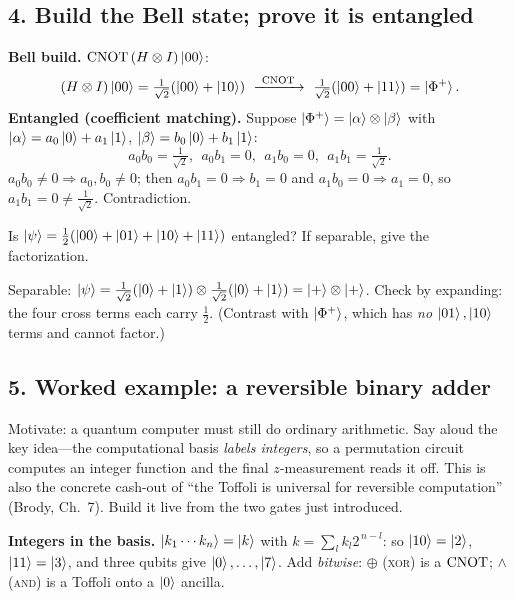 \documentclass[11pt]{article}
\begin{document}
\subsection*{4. Build the Bell state; prove it is entangled }
\begin{board}
\textbf{Bell build.} $\mathrm{CNOT}\,(H\otimes I)\ket{00}$:
\[
  (H\otimes I)\ket{00}=\tfrac1{\sqrt2}(\ket{00}+\ket{10})
  \ \xrightarrow{\ \CNOT\ }\ \tfrac1{\sqrt2}(\ket{00}+\ket{11})=\ket{\Phi^+}.
\]
\textbf{Entangled (coefficient matching).} Suppose $\ket{\Phi^+}=\ket\alpha\otimes\ket\beta$
with $\ket\alpha=a_0\ket0+a_1\ket1$, $\ket\beta=b_0\ket0+b_1\ket1$:
\[
  a_0b_0=\tfrac1{\sqrt2},\ \ a_0b_1=0,\ \ a_1b_0=0,\ \ a_1b_1=\tfrac1{\sqrt2}.
\]
$a_0b_0\ne0\Rightarrow a_0,b_0\ne0$; then $a_0b_1=0\Rightarrow b_1=0$ and
$a_1b_0=0\Rightarrow a_1=0$, so $a_1b_1=0\ne\tfrac1{\sqrt2}$. Contradiction.
\end{board}

\begin{inclass}\label{ic:sep}
Is $\ket\psi=\tfrac12(\ket{00}+\ket{01}+\ket{10}+\ket{11})$ entangled? If separable,
give the factorization.
\end{inclass}
\begin{answer}
Separable: $\ket\psi=\tfrac1{\sqrt2}(\ket0+\ket1)\otimes\tfrac1{\sqrt2}(\ket0+\ket1)
=\ket{+}\otimes\ket{+}$. Check by expanding: the four cross terms each carry $\tfrac12$. \checkmark
(Contrast with $\ket{\Phi^+}$, which has \emph{no} $\ket{01},\ket{10}$ terms and cannot factor.)
\end{answer}

\subsection*{5. Worked example: a reversible binary adder }
Motivate: a quantum computer must still do ordinary arithmetic. Say aloud the key
idea---the computational basis \emph{labels integers}, so a permutation circuit
computes an integer function and the final $z$-measurement reads it off. This is also
the concrete cash-out of ``the Toffoli is universal for reversible computation''
(Brody, Ch.~7). Build it live from the two gates just introduced.

\begin{board}
\textbf{Integers in the basis.} $\ket{k_1\cdots k_n}=\ket{k}$ with
$k=\sum_l k_l 2^{\,n-l}$: so $\ket{10}=\ket2$, $\ket{11}=\ket3$, and three qubits give
$\ket0,\dots,\ket7$. Add \emph{bitwise}: $\oplus$ (\textsc{xor}) is a $\mathrm{CNOT}$;
$\wedge$ (\textsc{and}) is a Toffoli onto a $\ket0$ ancilla.
\end{board}
\end{document}
